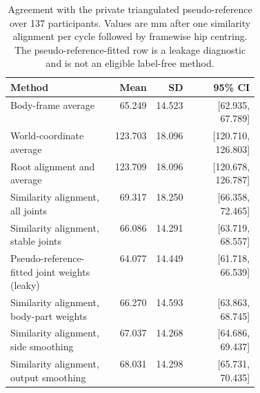 \begin{table}[h]
\caption{Agreement with the private triangulated pseudo-reference over 137
participants. Values are mm after one similarity alignment per cycle followed
by framewise hip centring. The pseudo-reference-fitted row is a leakage
diagnostic and is not an eligible label-free method.}
\label{tab:deterministic}
\centering
\scriptsize
\setlength{\tabcolsep}{3pt}
\begin{tabular}{p{0.42\linewidth}rrr}
\toprule
Method & Mean & SD & 95\% CI\\
\midrule
Body-frame average & 65.249 & 14.523 & [62.935, 67.789] \\ %
World-coordinate average & 123.703 & 18.096 & [120.710, 126.803] \\ %
Root alignment and average & 123.709 & 18.096 & [120.678, 126.787] \\ %
Similarity alignment, all joints & 69.317 & 18.250 & [66.358, 72.465] \\ %
Similarity alignment, stable joints & 66.086 & 14.291 & [63.719, 68.557] \\ %
Pseudo-reference-fitted joint weights (leaky) & 64.077 & 14.449 & [61.718, 66.539] \\ %
Similarity alignment, body-part weights & 66.270 & 14.593 & [63.863, 68.745] \\ %
Similarity alignment, side smoothing & 67.037 & 14.268 & [64.686, 69.437] \\ %
Similarity alignment, output smoothing & 68.031 & 14.298 & [65.731, 70.435] \\ %
\bottomrule
\end{tabular}
\end{table}
